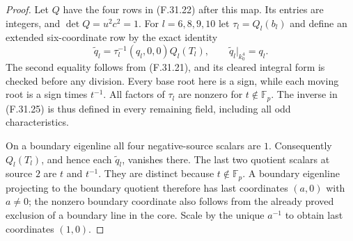 \begin{proof}
Let $Q$ have the four rows in (F.31.22)
after this map. Its entries are integers,
and $\det Q=u^2c^2=1$.
For $l=6,8,9,10$ let
$\tau_l=Q_l(b_l)$ and define an extended
six-coordinate row by the exact identity
\[
 \widetilde q_l=
       \tau_l^{-1}(q_l,0,0)Q_l(T_l),\qquad
 \widetilde q_l|_{k_0^4}=q_l.
                                                               \tag{F.31.25}
\]
The second equality follows from
(F.31.21), and its cleared integral
form is checked before any division.
Every base root here is a sign, while
each moving root is a sign times $t^{-1}$.
All factors of $\tau_l$ are nonzero
for $t\notin\mathbb F_p$.
The inverse in (F.31.25) is thus defined
in every remaining field, including
all odd characteristics.

On a boundary eigenline all four
negative-source scalars are $1$.
Consequently $Q_l(T_l)$, and hence
each $\widetilde q_l$, vanishes there.
The last two quotient scalars at
source $2$ are $t$ and $t^{-1}$.
They are distinct because $t\notin\mathbb F_p$.
A boundary eigenline projecting to
the boundary quotient therefore has
last coordinates $(a,0)$ with $a\ne0$;
the nonzero boundary coordinate also
follows from the already proved
exclusion of a boundary line in the core.
Scale by the unique $a^{-1}$ to obtain
last coordinates $(1,0)$.


\end{proof}
